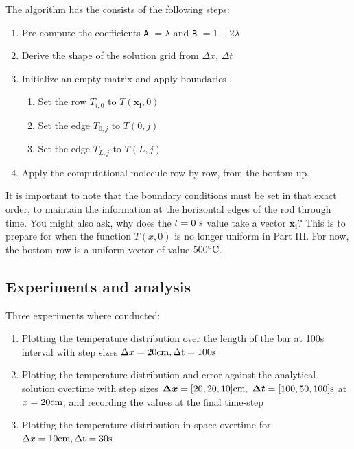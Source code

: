 \documentclass[a4paper]{article} %
\begin{document}
\begin{multicols}{2}
The algorithm has the consists of the following steps:
\begin{enumerate}[leftmargin=*, itemsep=-2mm, before=\vspace{-7mm}]
    \item Pre-compute the coefficients \verb|A| $= \lambda$ and \verb|B| $= 1 - 2\lambda$
    \item Derive the shape of the solution grid from $\Delta x$, $\Delta t$
    \item Initialize an empty matrix and apply boundaries
\begin{enumerate}[before=\vspace{-3mm}]
    \item Set the row $T_{i,0}$ to $T(\bm{x_i}, 0)$
    \item Set the edge $T_{0,j}$ to $T(0,j)$
    \item Set the edge $T_{L,j}$ to $T(L,j)$
\end{enumerate}
    \item Apply the computational molecule row by row, from the bottom up.
\end{enumerate}
It is important to note that the boundary conditions must be set in that exact order, to maintain the information at the horizontal edges of the rod through time. You might also ask, why does the $t = 0\ \rm{s}$ value take a vector $\bm{x_i}$? This is to prepare for when the function $T(x,0)$ is no longer uniform in Part III. For now, the bottom row is a uniform vector of value $500 ^\circ \rm{C}$.

\subsection{Experiments and analysis}
Three experiments where conducted:
\begin{enumerate}[leftmargin=*, itemsep=-2mm]
    \item  Plotting the temperature distribution over the length of the bar at 100s interval with step sizes $\Delta x = 20\rm{cm}, \Delta t = 100\rm{s}$
    \item  Plotting the temperature distribution and error against the analytical solution overtime with step sizes $\bm{\Delta x} = [20,20,10]\rm{cm},\ $$\bm{\Delta t} = [100, 50, 100]\rm{s}$ at $x=20\rm{cm}$, and recording the values at the final time-step 
    \item Plotting the temperature distribution in space overtime for $\Delta x = 10\rm{cm}, \Delta t = 30\rm{s}$
\end{enumerate}



\end{multicols}
\end{document}
